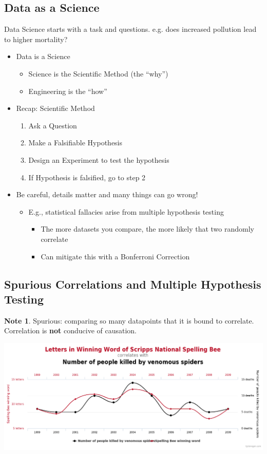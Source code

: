 \documentclass[11pt]{article}
\theoremstyle{definition}
\newtheorem{note}{Note}
\begin{document}
\subsection{Data as a Science}
Data Science starts with a task and questions.
e.g. does increased pollution lead to higher mortality?
\begin{itemize}
  \item Data is a Science
  \begin{itemize}
    \item Science is the Scientific Method (the “why”)
    \item Engineering is the “how”
  \end{itemize}
  \item Recap: Scientific Method
  \begin{enumerate}
    \item Ask a Question
    \item Make a Falsifiable Hypothesis
    \item Design an Experiment to test the hypothesis
    \item If Hypothesis is falsified, go to step 2
  \end{enumerate}
  \item Be careful, details matter and many things can go wrong!
  \begin{itemize}
    \item E.g., statistical fallacies arise from multiple hypothesis testing
    \begin{itemize}
      \item The more datasets you compare, the more likely that two randomly correlate
      \item Can mitigate this with a Bonferroni Correction
    \end{itemize}
  \end{itemize}
\end{itemize}

\subsection{Spurious Correlations and Multiple Hypothesis Testing}
\begin{note}
  Spurious: comparing so many datapoints that it is bound to correlate. 
  Correlation is \textbf{not} conducive of causation.
\end{note}
\includegraphics[width = \textwidth]{5.png}
\end{document}
